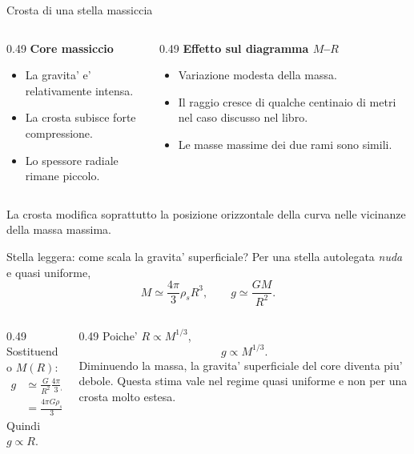\begin{frame}{Crosta di una stella massiccia}
\small
\begin{columns}[T,onlytextwidth]
\begin{column}{0.49\textwidth}
\textbf{Core massiccio}
\begin{itemize}
\item La gravita' e' relativamente intensa.
\item La crosta subisce forte compressione.
\item Lo spessore radiale rimane piccolo.
\end{itemize}
\end{column}
\begin{column}{0.49\textwidth}
\textbf{Effetto sul diagramma $M$--$R$}
\begin{itemize}
\item Variazione modesta della massa.
\item Il raggio cresce di qualche centinaio di metri nel caso discusso nel libro.
\item Le masse massime dei due rami sono simili.
\end{itemize}
\end{column}
\end{columns}
\medskip
La crosta modifica soprattutto la posizione orizzontale della curva nelle vicinanze della massa massima.
\end{frame}

\begin{frame}{Stella leggera: come scala la gravita' superficiale?}
\small
Per una stella autolegata \emph{nuda} e quasi uniforme,
\[
M\simeq\frac{4\pi}{3}\rho_sR^3,
\qquad g\simeq\frac{GM}{R^2}.
\]
\begin{columns}[T,onlytextwidth]
\begin{column}{0.49\textwidth}
Sostituendo $M(R)$:
\[
\begin{aligned}
g&\simeq\frac{G}{R^2}\frac{4\pi}{3}\rho_sR^3\\
 &=\frac{4\pi G\rho_s}{3}R.
\end{aligned}
\]
Quindi $g\propto R$.
\end{column}
\begin{column}{0.49\textwidth}
Poiche' $R\propto M^{1/3}$,
\[
g\propto M^{1/3}.
\]
Diminuendo la massa, la gravita' superficiale del core diventa piu' debole.
\medskip
Questa stima vale nel regime quasi uniforme e non per una crosta molto estesa.
\end{column}
\end{columns}
\end{frame}

